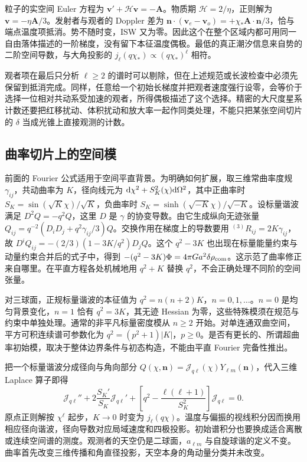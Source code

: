 粒子的实空间 Euler 方程为 $\bm v'+\mathcal H\bm v=-\bm A$。物质期 $\mathcal H=2/\eta$，正则解为 $\bm v=-\eta\bm A/3$。发射者与观者的 Doppler 差为 $\bm n\cdot(\bm v_e-\bm v_o)=+\chi_*\bm A\cdot\bm n/3$，恰与端点温度项抵消。势不随时变，ISW 又为零。因此这个在整个区域内都可用同一自由落体描述的一阶梯度，没有留下本征温度偶极。最低的真正潮汐信息来自势的二阶空间导数，与大角投影的 $j_\ell(q\chi_*)\propto(q\chi_*)^\ell$ 相符。

观者项在最后只分析 $\ell\ge2$ 的谱时可以剔除，但在上述规范或长波检查中必须先保留到抵消完成。同样，任意给一个初始长梯度并把观者速度强行设零，会等价于选择一位相对共动系受加速的观者，所得偶极描述了这个选择。精密的大尺度星系计数还要把红移扰动、体积扰动和放大率一起作同类处理，不能只把某张空间切片的 $\delta$ 当成光锥上直接观测的计数。

\subsection{曲率切片上的空间模}

前面的 Fourier 公式适用于空间平直背景。为明确如何扩展，取三维常曲率度规 $\gamma_{ij}$，共动曲率为 $K$，径向线元为 $\dd\chi^2+S_K^2(\chi)\dd\Omega^2$，其中正曲率时 $S_K=\sin(\sqrt K\chi)/\sqrt K$，负曲率时 $S_K=\sinh(\sqrt{-K}\chi)/\sqrt{-K}$。设标量谐波满足 $D^2Q=-q^2Q$，这里 $D$ 是 $\gamma$ 的协变导数。由它生成纵向无迹张量 $Q_{ij}=q^{-2}(D_iD_j+q^2\gamma_{ij}/3)Q$。交换作用在梯度上的导数要用 ${}^{(3)}R_{ij}=2K\gamma_{ij}$，故 $D^iQ_{ij}=-(2/3)(1-3K/q^2)D_jQ$。这个 $q^2-3K$ 也出现在标量能量约束与动量约束合并后的式子中，得到
$-(q^2-3K)\Phi=4\pi Ga^2\delta\rho_{\rm com}$。这示范了曲率修正来自哪里。在平直方程各处机械地用 $q^2+K$ 替换 $q^2$，不会正确处理不同阶的空间张量。

对三球面，正规标量谐波的本征值为 $q^2=n(n+2)K$，$n=0,1,\ldots$。$n=0$ 是均匀背景变化，$n=1$ 恰有 $q^2=3K$，其无迹 Hessian 为零，这些特殊模须在规范与约束中单独处理。通常的非平凡标量密度模从 $n\ge2$ 开始。对单连通双曲空间，平方可积连续谱可参数化为 $q^2=(p^2+1)|K|$，$p\ge0$。是否有更长的、所谓超曲率初始模，取决于整体边界条件与初态构造，不能由平直 Fourier 完备性推出。

把一个标量谐波分成径向与角向部分 $Q(\chi,\bm n)=\mathcal J_{q\ell}(\chi)Y_{\ell m}(\bm n)$，代入三维 Laplace 算子即得
\[
 \mathcal J_{q\ell}''+
 2\frac{S_K'}{S_K}\mathcal J_{q\ell}'
 +\left[q^2-\frac{\ell(\ell+1)}{S_K^2}\right]\mathcal J_{q\ell}=0 .
\]
原点正则解按 $\chi^\ell$ 起步，$K\to0$ 时变为 $j_\ell(q\chi)$。温度与偏振的视线积分因而换用相应径向谐波，径向导数对应局域速度和四极投影。初始谱积分也要换成适合离散或连续空间谱的测度。观测者的天空仍是二球面，$a_{\ell m}$ 与自旋球谐的定义不变。曲率首先改变三维传播和角直径投影，天空本身的角动量分类并未改变。


